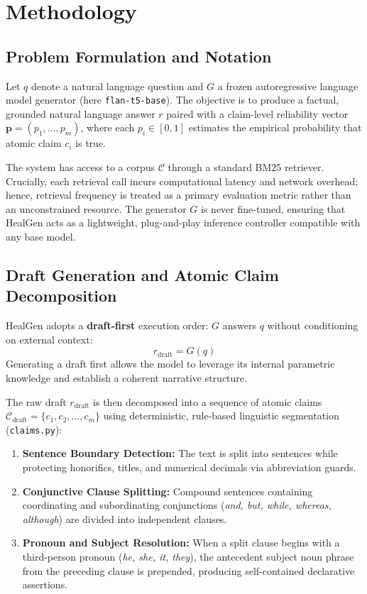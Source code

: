 
\section{Methodology}
\label{sec:method}

\subsection{Problem Formulation and Notation}
Let $q$ denote a natural language question and $G$ a frozen autoregressive language model generator (here \texttt{flan-t5-base}). The objective is to produce a factual, grounded natural language answer $r$ paired with a claim-level reliability vector $\mathbf{p} = (p_1, \dots, p_m)$, where each $p_i \in [0, 1]$ estimates the empirical probability that atomic claim $c_i$ is true. 

The system has access to a corpus $\mathcal{C}$ through a standard BM25 retriever. Crucially, each retrieval call incurs computational latency and network overhead; hence, retrieval frequency is treated as a primary evaluation metric rather than an unconstrained resource. The generator $G$ is never fine-tuned, ensuring that HealGen acts as a lightweight, plug-and-play inference controller compatible with any base model.

\subsection{Draft Generation and Atomic Claim Decomposition}
HealGen adopts a \textbf{draft-first} execution order: $G$ answers $q$ without conditioning on external context:
\begin{equation}
  r_{\text{draft}} = G(q)
\end{equation}
Generating a draft first allows the model to leverage its internal parametric knowledge and establish a coherent narrative structure. 

The raw draft $r_{\text{draft}}$ is then decomposed into a sequence of atomic claims $\mathcal{C}_{\text{draft}} = \{c_1, c_2, \dots, c_m\}$ using deterministic, rule-based linguistic segmentation (\texttt{claims.py}):
\begin{enumerate}
  \item \textbf{Sentence Boundary Detection:} The text is split into sentences while protecting honorifics, titles, and numerical decimals via abbreviation guards.
  \item \textbf{Conjunctive Clause Splitting:} Compound sentences containing coordinating and subordinating conjunctions (\emph{and, but, while, whereas, although}) are divided into independent clauses.
  \item \textbf{Pronoun and Subject Resolution:} When a split clause begins with a third-person pronoun (\emph{he, she, it, they}), the antecedent subject noun phrase from the preceding clause is prepended, producing self-contained declarative assertions.
\end{enumerate}

